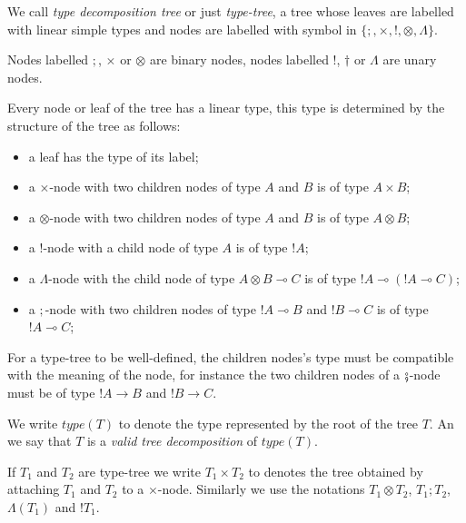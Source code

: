 \begin{dfn}
We call \emph{type decomposition tree} or just \emph{type-tree}, a tree whose leaves are labelled with linear simple types
and nodes are labelled with symbol in
$\{ ;, \times, !, \otimes, \Lambda \} $.

Nodes labelled $;$, $\times$ or $\otimes$ are binary nodes, nodes labelled $!$, $\dagger$ or $\Lambda$ are unary nodes.


Every node or leaf of the tree has a linear type, this type is determined by the
structure of the tree as follows:
\begin{itemize}
\item a leaf has the type of its label;

\item a $\times$-node with two children nodes of type $A$
and $B$ is of type $A \times B$;

\item a $\otimes$-node with two children nodes of type $A$
and $B$ is of type $A\otimes B$;

\item a $!$-node with a child node of type $A$ is of type $!A$;

\item a $\Lambda$-node with the child node of type $A \otimes B \multimap C$ is of type $!A \multimap (!A \multimap C)$;

\item a $;$-node with two children nodes of type $!A\multimap B$
and $!B \multimap C$ is of type $!A \multimap C$;

\end{itemize}

For a type-tree to be well-defined, the children nodes's type must be compatible with the meaning of the node, for instance
the two children nodes of a $\fatsemi$-node must be of type $!A\rightarrow B$ and $!B\rightarrow C$.

We write $type(T)$ to denote the type represented by the root of the tree $T$. An we say that $T$ is a \emph{valid
tree decomposition} of $type(T)$.

If $T_1$ and $T_2$ are type-tree we write $T_1 \times T_2$ to denotes the tree obtained by attaching $T_1$ and $T_2$ to a $\times$-node.
Similarly we use the notations $T_1 \otimes T_2$, $T_1 ; T_2$, $\Lambda(T_1)$ and $!T_1$.
\end{dfn}



